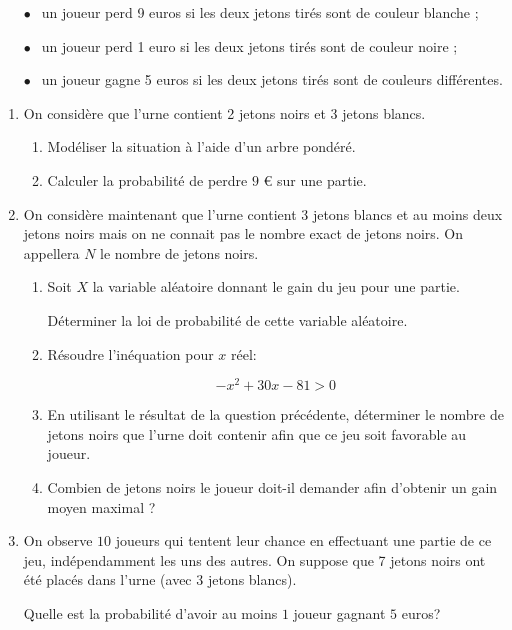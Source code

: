 \documentclass[12pt]{book}
\begin{document}
\setlength\parindent{1cm}
\begin{itemize}
\item[$\bullet~~$] un joueur perd 9 euros si les deux jetons tirés sont de couleur blanche ;
\item[$\bullet~~$] un joueur perd 1 euro si les deux jetons tirés sont de couleur noire ;
\item[$\bullet~~$] un joueur gagne 5 euros si les deux jetons tirés sont de couleurs différentes.
\end{itemize}
\setlength\parindent{0cm}

\medskip

\begin{enumerate}
\item On considère que l'urne contient 2 jetons noirs et 3 jetons blancs.
	\begin{enumerate}
		\item Modéliser la situation à l'aide d'un arbre pondéré.
		\item Calculer la probabilité de perdre $9$ \euro{} sur une partie.
	\end{enumerate}	
\item On considère maintenant que l'urne contient 3 jetons blancs et au moins deux jetons noirs mais on ne connait pas le nombre exact de jetons noirs. On appellera $N$ le nombre de jetons noirs.
	\begin{enumerate}
		\item Soit $X$ la variable aléatoire donnant le gain du jeu pour une partie.
		
Déterminer la loi de probabilité de cette variable aléatoire.
		\item Résoudre l'inéquation pour $x$ réel:
		
\[-x^2  + 30x - 81 > 0\]

		\item En utilisant le résultat de la question précédente, déterminer le nombre de jetons noirs que l'urne doit contenir afin que ce jeu soit favorable au joueur.
		\item Combien de jetons noirs le joueur doit-il demander afin d'obtenir un gain moyen maximal ?
	\end{enumerate}
\item On observe $10$ joueurs qui tentent leur chance en effectuant une partie de ce jeu, indépendamment les uns des autres. On suppose que 7 jetons noirs ont été placés dans l'urne (avec 3 jetons blancs). 

Quelle est la probabilité d'avoir au moins $1$ joueur gagnant $5$ euros?
\end{enumerate}
\end{document}
